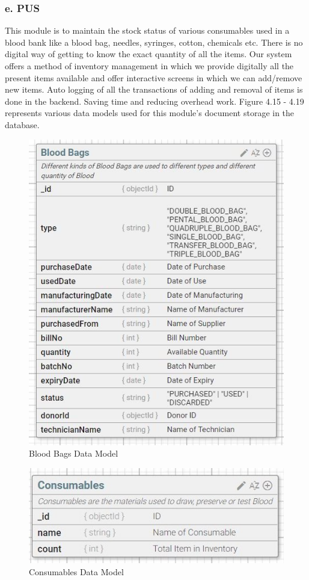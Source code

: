 \documentclass[BTech]{srmuthesis}
\begin{document}
\subsubsection{e. \ac{PUS}}
This module is to maintain the stock status of various consumables used in a blood bank like a blood bag, needles, syringes, cotton, chemicals etc. There is no digital way of getting to know the exact quantity of all the items. Our system offers a method of inventory management in which we provide digitally all the present items available and offer interactive screens in which we can add/remove new items. Auto logging of all the transactions of adding and removal of items is done in the backend. Saving time and reducing overhead work. Figure 4.15 - 4.19 represents various data models used for this module's document storage in the database.
\begin{figure}[H]
	\centering
	\includegraphics[scale=0.6]{pus_blood_bags.jpeg}
	\caption{Blood Bags Data Model}
\end{figure}
\begin{figure}[H]
	\centering
	\includegraphics[scale=0.6]{pus_consumables.jpeg}
	\caption{Consumables Data Model}
\end{figure}
\end{document}
